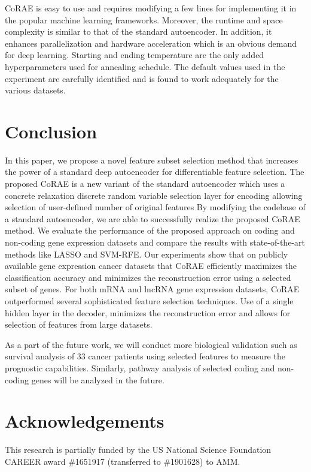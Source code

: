 \documentclass{bioinfo}
\begin{document}
CoRAE is easy to use and requires modifying a few lines for implementing it in the popular machine learning frameworks.
Moreover, the runtime and space complexity is similar to that of the standard autoencoder.
In addition, it enhances parallelization and hardware acceleration which is an obvious demand for deep learning.
Starting and ending temperature are the only added hyperparameters used for annealing schedule.
The default values used in the experiment are carefully identified and is found to work adequately for the various datasets.

\section{Conclusion}
In this paper, we propose a novel feature subset selection method that increases the power of a standard deep autoencoder for differentiable feature selection. 
The proposed CoRAE is a new variant of the standard autoencoder which uses a concrete relaxation discrete random variable selection layer for encoding allowing selection of user-defined number of original features
By modifying the codebase of a standard autoencoder, we are able to successfully realize the proposed CoRAE method.
We evaluate the performance of the proposed approach on coding and non-coding gene expression datasets and compare the results with state-of-the-art methods like LASSO and SVM-RFE.
Our experiments show that on publicly available gene expression cancer datasets that CoRAE efficiently maximizes the classification accuracy and minimizes the reconstruction error using a selected subset of genes.
For both mRNA and lncRNA gene expression datasets, CoRAE outperformed several sophisticated feature selection techniques.
Use of a single hidden layer in the decoder, minimizes the reconstruction error and allows for selection of features from large datasets.

As a part of the future work, we will conduct more biological validation such as survival analysis of 33 cancer patients using selected features to measure the prognostic capabilities.
Similarly, pathway analysis of selected coding and non-coding genes will be analyzed in the future.

\section*{Acknowledgements}


This research is partially funded by the US National Science Foundation CAREER award \#1651917 (transferred to \#1901628) to AMM.


%
%
%
%

\end{document}
